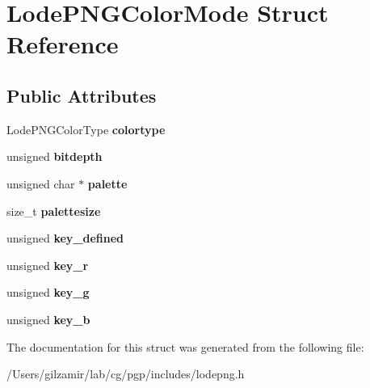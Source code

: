 \hypertarget{struct_lode_p_n_g_color_mode}{}\section{Lode\+P\+N\+G\+Color\+Mode Struct Reference}
\label{struct_lode_p_n_g_color_mode}
\subsection*{Public Attributes}
\begin{DoxyCompactItemize}
\item 
\mbox{\label{struct_lode_p_n_g_color_mode_a4f3df7240411abe80546052d197fbe8d}} 
Lode\+P\+N\+G\+Color\+Type {\bfseries colortype}
\item 
\mbox{\label{struct_lode_p_n_g_color_mode_ad20010b9561980f65281bc17f7848253}} 
unsigned {\bfseries bitdepth}
\item 
\mbox{\label{struct_lode_p_n_g_color_mode_a54f0a793238009fcb95f081626fae308}} 
unsigned char $\ast$ {\bfseries palette}
\item 
\mbox{\label{struct_lode_p_n_g_color_mode_a407557f056168682d9319aeb60866dcc}} 
size\+\_\+t {\bfseries palettesize}
\item 
\mbox{\label{struct_lode_p_n_g_color_mode_ab9105505c5d56cfc6ce4efe1bb288b54}} 
unsigned {\bfseries key\+\_\+defined}
\item 
\mbox{\label{struct_lode_p_n_g_color_mode_a29e64327bca1f3d16235e9ff471e4d50}} 
unsigned {\bfseries key\+\_\+r}
\item 
\mbox{\label{struct_lode_p_n_g_color_mode_ad98309f36d289392b0c440baa50af9f6}} 
unsigned {\bfseries key\+\_\+g}
\item 
\mbox{\label{struct_lode_p_n_g_color_mode_a93a269405fee0d1c5045a1a671ed1de8}} 
unsigned {\bfseries key\+\_\+b}
\end{DoxyCompactItemize}


The documentation for this struct was generated from the following file\+:\begin{DoxyCompactItemize}
\item 
/\+Users/gilzamir/lab/cg/pgp/includes/lodepng.\+h\end{DoxyCompactItemize}
